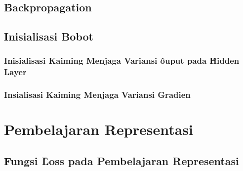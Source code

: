     \subsection{\f{Backpropagation}}

    \subsection{Inisialisasi Bobot}
        \subsubsection{Inisialisasi Kaiming Menjaga Variansi \f{ouput} pada \f{Hidden Layer}}

        \subsubsection{Insialisasi Kaiming Menjaga Variansi Gradien}



\section{Pembelajaran Representasi}

    \subsection{Fungsi \f{Loss} pada Pembelajaran Representasi}













        


